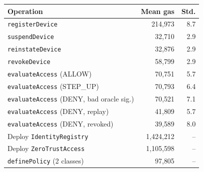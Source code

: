 \begin{tabular}{@{}lrr@{}}
\toprule
\textbf{Operation} & \textbf{Mean gas} & \textbf{Std.} \\
\midrule
\texttt{registerDevice} & 214{,}973 & 8.7 \\
\texttt{suspendDevice} & 32{,}710 & 2.9 \\
\texttt{reinstateDevice} & 32{,}876 & 2.9 \\
\texttt{revokeDevice} & 58{,}799 & 2.9 \\
\texttt{evaluateAccess} (ALLOW) & 70{,}751 & 5.7 \\
\texttt{evaluateAccess} (STEP\_UP) & 70{,}793 & 6.4 \\
\texttt{evaluateAccess} (DENY, bad oracle sig.) & 70{,}521 & 7.1 \\
\texttt{evaluateAccess} (DENY, replay) & 41{,}809 & 5.7 \\
\texttt{evaluateAccess} (DENY, revoked) & 39{,}589 & 8.0 \\
\midrule
Deploy \texttt{IdentityRegistry} & 1{,}424{,}212 & -- \\
Deploy \texttt{ZeroTrustAccess} & 1{,}105{,}598 & -- \\
\texttt{definePolicy} (2 classes) & 97{,}805 & -- \\
\bottomrule
\end{tabular}